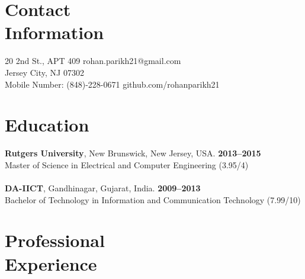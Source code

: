 \documentclass[margin,line]{res}
\begin{document}
\begin{resume}

    \section{\mysidestyle Contact\\Information}

    20 2nd St., APT 409			                            \hfill rohan.parikh21@gmail.com       \vspace{0mm}\\\vspace{0mm}%
    Jersey City, NJ 07302           						\hfill \vspace{0mm}\\\vspace{0mm}%
    Mobile Number: (848)-228-0671					    	\hfill github.com/rohanparikh21  	  \vspace{0mm}\\\vspace{-4.5mm}%

    \section{\mysidestyle Education}
	\textbf{Rutgers University}, New Brunswick, New Jersey, USA. \hfill \textbf{2013--2015}\\
	\textnormal{Master of Science in Electrical and Computer Engineering (3.95/4)} \\
    \\
	\textbf{DA-IICT}, Gandhinagar, Gujarat, India. \hfill \textbf{2009--2013}\\
	\textnormal{Bachelor of Technology in Information and Communication Technology (7.99/10)}
    \section{\mysidestyle Professional\\Experience}


\end{resume}
\end{document}
